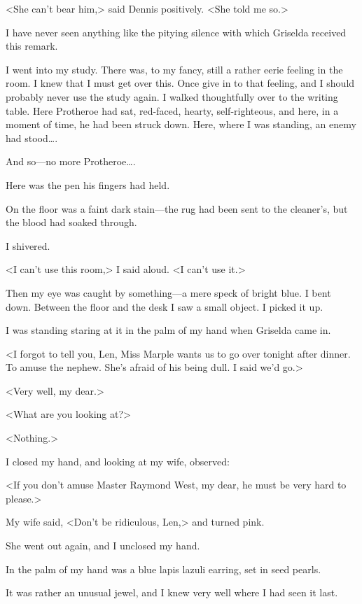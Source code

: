 <She can't bear him,> said Dennis positively. <She told me so.>

I have never seen anything like the pitying silence with which Griselda received this remark.

I went into my study. There was, to my fancy, still a rather eerie feeling in the room. I knew that I must get over this. Once give in to that feeling, and I should probably never use the study again. I walked thoughtfully over to the writing table. Here Protheroe had sat, red-faced, hearty, self-righteous, and here, in a moment of time, he had been struck down. Here, where I was standing, an enemy had stood\dots.

And so—no more Protheroe\dots.

Here was the pen his fingers had held.

On the floor was a faint dark stain—the rug had been sent to the cleaner's, but the blood had soaked through.

I shivered.

<I can't use this room,> I said aloud. <I can't use it.>

Then my eye was caught by something—a mere speck of bright blue. I bent down. Between the floor and the desk I saw a small object. I picked it up.

I was standing staring at it in the palm of my hand when Griselda came in.

<I forgot to tell you, Len, Miss Marple wants us to go over tonight after dinner. To amuse the nephew. She's afraid of his being dull. I said we'd go.>

<Very well, my dear.>

<What are you looking at?>

<Nothing.>

I closed my hand, and looking at my wife, observed:

<If you don't amuse Master Raymond West, my dear, he must be very hard to please.>

My wife said, <Don't be ridiculous, Len,> and turned pink.

She went out again, and I unclosed my hand.

In the palm of my hand was a blue lapis lazuli earring, set in seed pearls.

It was rather an unusual jewel, and I knew very well where I had seen it last.